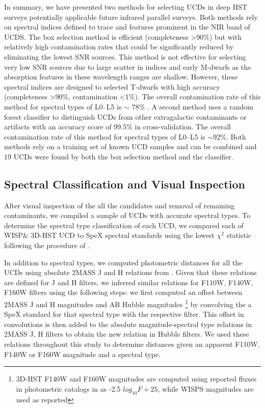 \documentclass[manuscript]{aastex}
\begin{document}
In summary, we have presented two methods for selecting UCDs in deep HST surveys potentially applicable future infrared parallel surveys. Both methods rely on spectral indices defined to trace \wat and \meth features prominent in the NIR band of UCDS. The box selection method is efficient (completeness \textgreater 90\%) but with relatively high contamination rates that could be significantly reduced by eliminating the lowest SNR sources. This method is not effective for selecting very low SNR sources due to large scatter in indices and early M-dwarfs as the absorption features in these wavelength ranges are shallow. However, these spectral indices are designed to selected T-dwarfs with high accuracy (completeness \textgreater 90\%, contamination \textless 1\%). The overall contamination rate of this method for spectral types of L0--L5 is $\sim$ 78\% . A second method uses a random forest classifier to distinguish UCDs from other extragalactic contaminants or artifacts with an accuracy score of 99.5\% in cross-validation. The overall contamination rate of this method  for spectral types of L0--L5 is $\sim$92\%. Both methods rely on a training set of known UCD samples and can be combined and 19 UCDs were found by both the box selection method and the classifier. 


\subsection{Spectral Classification and Visual Inspection} \label{visual}

After visual inspection of the all the candidates and removal of remaining contaminants, we compiled a sample of UCDs with accurate spectral types. To determine the spectral type classification of each UCD, we compared each of WISP\& 3D-HST UCD to SpeX spectral standards using the lowest $\chi^2$ statistic following the procedure of \cite{2010ApJS..190..100K}. 

In addition to spectral types, we computed photometric distances for all the UCDs using absolute 2MASS J and H relations from  \cite{2012ApJS..201...19D}. Given that these relations are defined for J and H filters, we inferred similar relations for F110W, F140W, F160W filters using the following steps: we first computed an offset between 2MASS J and H magnitudes and AB Hubble magnitudes  \footnote{3D-HST F140W and F160W magnitudes are computed using reported fluxes in photometric catalogs in \citealt{Skelton2014} as -2.5  $log_{10}F+ 25$, while WISPS magnitudes are used as reported } by convolving the a SpeX standard for that spectral type with the respective filter. This offset in convolutions is then added to the absolute magnitude-spectral type relations in 2MASS J, H filters to obtain the new relation in Hubble filters. We used these relations throughout this study to determine distances given an apparent F110W, F140W or F160W magnitude and a spectral type. 
\end{document}
